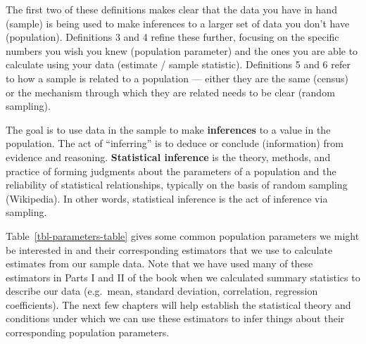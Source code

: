 \documentclass[
  letterpaper,
  DIV=11,
  numbers=noendperiod]{scrreprt}
\theoremstyle{definition}
\theoremstyle{remark}
\begin{document}
The first two of these definitions makes clear that the data you have in
hand (sample) is being used to make inferences to a larger set of data
you don't have (population). Definitions 3 and 4 refine these further,
focusing on the specific numbers you wish you knew (population
parameter) and the ones you are able to calculate using your data
(estimate / sample statistic). Definitions 5 and 6 refer to how a sample
is related to a population --- either they are the same (census) or the
mechanism through which they are related needs to be clear (random
sampling).

The goal is to use data in the sample to make \textbf{inferences} to a
value in the population. The act of ``inferring'' is to deduce or
conclude (information) from evidence and reasoning. \textbf{Statistical
inference} is the theory, methods, and practice of forming judgments
about the parameters of a population and the reliability of statistical
relationships, typically on the basis of random sampling (Wikipedia). In
other words, statistical inference is the act of inference via sampling.

Table~\ref{tbl-parameters-table} gives some common population parameters
we might be interested in and their corresponding estimators that we use
to calculate estimates from our sample data. Note that we have used many
of these estimators in Parts I and II of the book when we calculated
summary statistics to describe our data (e.g.~mean, standard deviation,
correlation, regression coefficients). The next few chapters will help
establish the statistical theory and conditions under which we can use
these estimators to infer things about their corresponding population
parameters.
\end{document}
